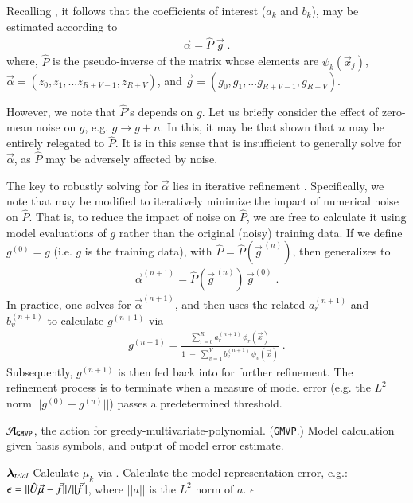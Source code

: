 \documentclass[twocolumn,aps,prd,floatfix,preprintnumbers,a4paper,nofootinbib,
superscriptaddress,10pt]{revtex4-1}
\def\gmvp#1{greedy-multivariate-polynomial#1
  (\texttt{GMVP}#1)\gdef\gmvp{\texttt{GMVP}}}
\begin{document}
%
\par Recalling , it follows that the coefficients of interest ($a_k$ and $b_k$), may be estimated according to
%
\begin{align}
  \label{eq:pinv2}
  \vec{\alpha} = \hat{P} \; \vec{g} \;.
\end{align}
%
where, $\hat{P}$ is the pseudo-inverse of the matrix whose elements are $\psi_k(\vec{x}_j)$, $\vec\alpha = ( z_0, z_1, ... z_{R+V-1},z_{R+V} )$, and $\vec{g} = ( g_0, g_1, ... g_{R+V-1},g_{R+V} )$.
%
\par However, we note that $\hat{P}$'s depends on $g$.
%
Let us briefly consider the effect of zero-mean noise on $g$, e.g. $g \rightarrow g+n$.
%
In this, it may be that shown that $n$ may be entirely relegated to $\hat{P}$.
%
It is in this sense that  is insufficient to generally solve for $\vec{\alpha}$, as $\hat{P}$ may be adversely affected by noise.
%
%
\par The key to robustly solving for $\vec{\alpha}$ lies in iterative refinement \cite{Press:1992:NRC:148286}.
%
Specifically, we note that  may be modified to iteratively minimize the impact of numerical noise on $\hat{P}$.
%
That is, to reduce the impact of noise on $\hat{P}$, we are free to calculate it using model evaluations of $g$ rather than the original (noisy) training data.
%
If we define $g^{(0)}=g$ (i.e. $g$ is the training data), with $\hat{P} = \hat{P}( \vec{g}^{\,(n)} )$, then  generalizes to
%
\begin{align}
  \label{eq:pinv3}
  \vec{\alpha}^{(n+1)} = \hat{P}(\vec{g}^{\,(n)}) \, \vec{g}^{(0)}\;.
\end{align}
%
In practice, one solves  for $\vec{\alpha}^{(n+1)}$, and then uses the related $a_r^{(n+1)}$ and $b_v^{(n+1)}$ to calculate $g^{(n+1)}$ via
%
\begin{align}
  \label{eq:rat4}
  g^{(n+1)} =  \frac{ \sum_{r=0}^{R} a^{(n+1)}_r \, \phi_{r}(\vec{x}) }{ 1\;-\;  \sum_{v=1}^{V} b^{(n+1)}_v \, \phi_{v}(\vec{x}) } \; .
\end{align}
%
Subsequently, $g^{(n+1)}$ is then fed back into  for further refinement.
%
The refinement process is to terminate when a measure of model error (e.g. the $L^2$ norm $||g^{(0)}-g^{(n)}||$) passes a predetermined threshold.
%
%
%
{\scriptsize
\begin{algorithm}[H]
  \caption{$\mathcal{A}_{\gmvp}$, the action for \gmvp. Model calculation given basis symbols, and output of model error estimate.}
  \label{alg:A_gmvp}
  \begin{algorithmic}[1]
     ${\bm{\lambda}}_{trial}$
    \vskip 10pt
    \State Calculate $\mu_k$ via .
    \State Calculate the model representation error, e.g.: $\epsilon = ||\hat{U} \vec{\mu} - \vec{f}||/||\vec{f}||$, where $||a||$ is the $L^2$ norm of $a$.
    \vskip 10pt
     $\epsilon$
  \end{algorithmic}
\end{algorithm}
}
\end{document}
